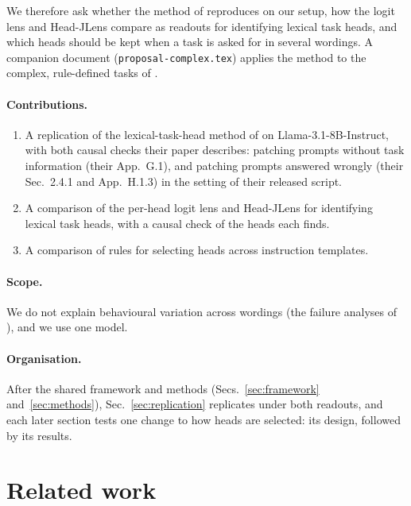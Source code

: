 \documentclass[11pt,a4paper]{article}
\begin{document}
We therefore ask whether the method of \citet{yang2026shared} reproduces on our setup, how the logit lens and Head-JLens compare as readouts for identifying lexical task heads, and which heads should be kept when a task is asked for in several wordings. A companion document (\texttt{proposal-complex.tex}) applies the method to the complex, rule-defined tasks of \citet{fu2026rules}.

\paragraph{Contributions.}
\begin{enumerate}
\item A replication of the lexical-task-head method of \citet{yang2026shared} on Llama-3.1-8B-Instruct, with both causal checks their paper describes: patching prompts without task information (their App.~G.1), and patching prompts answered wrongly (their Sec.~2.4.1 and App.~H.1.3) in the setting of their released script.
\item A comparison of the per-head logit lens and Head-JLens for identifying lexical task heads, with a causal check of the heads each finds.
\item A comparison of rules for selecting heads across instruction templates.
\end{enumerate}

\paragraph{Scope.} We do not explain behavioural variation across wordings (the failure analyses of \citealp[Sec.~2.4]{yang2026shared}), and we use one model.

\paragraph{Organisation.} After the shared framework and methods (Secs.~\ref{sec:framework} and~\ref{sec:methods}), Sec.~\ref{sec:replication} replicates \citet{yang2026shared} under both readouts, and each later section tests one change to how heads are selected: its design, followed by its results.

\section{Related work}\label{sec:background}
\end{document}
